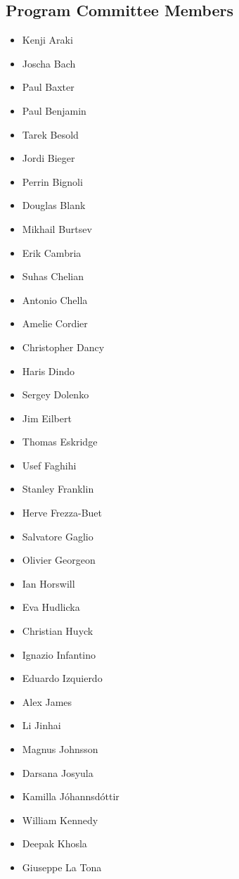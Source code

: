 \documentclass[10pt,fleqn,openany]{book} %
\begin{document}
\subsection{Program Committee Members}
	\begin{multicols}{2}
		\begin{itemize}
			\item Kenji Araki
			\item Joscha Bach
			\item Paul Baxter
			\item Paul Benjamin
			\item Tarek Besold
			\item Jordi Bieger
			\item Perrin Bignoli
			\item Douglas Blank
			\item Mikhail Burtsev
			\item Erik Cambria
			\item Suhas Chelian
			\item Antonio Chella
			\item Amelie Cordier
			\item Christopher Dancy
			\item Haris Dindo
			\item Sergey Dolenko
			\item Jim Eilbert
			\item Thomas Eskridge
			\item Usef Faghihi
			\item Stanley Franklin
			\item Herve Frezza-Buet
			\item Salvatore Gaglio
			\item Olivier Georgeon
			\item Ian Horswill
			\item Eva Hudlicka
			\item Christian Huyck
			\item Ignazio Infantino
			\item Eduardo Izquierdo
			\item Alex James
			\item Li Jinhai
			\item Magnus Johnsson
			\item Darsana Josyula
			\item Kamilla Jóhannsdóttir
			\item William Kennedy
			\item Deepak Khosla
			\item Giuseppe La Tona

\end{itemize}
\end{multicols}
\end{document}
